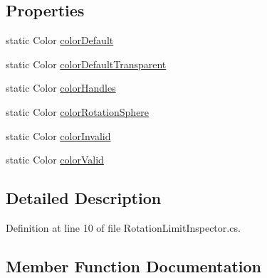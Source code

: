 \subsection*{Properties}
\begin{DoxyCompactItemize}
\item 
static Color \mbox{\hyperlink{class_root_motion_1_1_final_i_k_1_1_rotation_limit_inspector_a9429d7b759faa2fdaf375a4536cd75e4}{color\+Default}}
\item 
static Color \mbox{\hyperlink{class_root_motion_1_1_final_i_k_1_1_rotation_limit_inspector_ad394060a418d6a4bdb66f7768e646e3f}{color\+Default\+Transparent}}
\item 
static Color \mbox{\hyperlink{class_root_motion_1_1_final_i_k_1_1_rotation_limit_inspector_a238e525e2b33fd0c59dc2e115411b1b7}{color\+Handles}}
\item 
static Color \mbox{\hyperlink{class_root_motion_1_1_final_i_k_1_1_rotation_limit_inspector_ad67bda9082c9b3df76e8894823f266d9}{color\+Rotation\+Sphere}}
\item 
static Color \mbox{\hyperlink{class_root_motion_1_1_final_i_k_1_1_rotation_limit_inspector_ad062d6054dd4d66678534297b759145c}{color\+Invalid}}
\item 
static Color \mbox{\hyperlink{class_root_motion_1_1_final_i_k_1_1_rotation_limit_inspector_a4b9e0dfbc418a8ada3306f5757050ff2}{color\+Valid}}
\end{DoxyCompactItemize}


\subsection{Detailed Description}


Definition at line 10 of file Rotation\+Limit\+Inspector.\+cs.



\subsection{Member Function Documentation}
\mbox{\label{class_root_motion_1_1_final_i_k_1_1_rotation_limit_inspector_af855634477f7add508a6babbc97d20d6}} 
